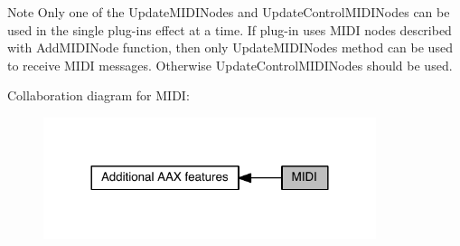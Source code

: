 \begin{DoxyNote}{Note}
Only one of the Update\+M\+I\+D\+I\+Nodes and Update\+Control\+M\+I\+D\+I\+Nodes can be used in the single plug-\/in\textquotesingle{}s effect at a time. If plug-\/in uses M\+I\+D\+I nodes described with Add\+M\+I\+D\+I\+Node function, then only Update\+M\+I\+D\+I\+Nodes method can be used to receive M\+I\+D\+I messages. Otherwise Update\+Control\+M\+I\+D\+I\+Nodes should be used. 
\end{DoxyNote}
Collaboration diagram for M\+I\+D\+I\+:
\nopagebreak
\begin{figure}[H]
\begin{center}
\leavevmode
\includegraphics[width=276pt]{a00336}
\end{center}
\end{figure}
